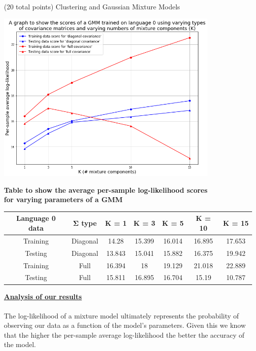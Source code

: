\documentclass[12pt]{article}
\begin{document}
\begin{question}{(20 total points) Clustering and Gaussian Mixture Models}
\begin{subquestion}
      \begin{answerbox}{52.8em}
        \scriptsize{
        \begin{center}
        \includegraphics[width=0.82\textwidth]{images/q35.png}
        \end{center}
        \begin{center}
        \textbf{Table to show the average per-sample log-likelihood scores} \\
        \textbf{for varying parameters of a GMM} \\
        \vspace{0.3cm}
        \begin{tabular}{ |c|c|c|c|c|c|c| } \hline
        \textbf{Language 0 data} & \textbf{$\mathbf{\Sigma}$ type} & \textbf{K = 1} & \textbf{K = 3} & \textbf{K = 5} & \textbf{K = 10} & \textbf{K = 15} \\ \hline
        Training & Diagonal & 14.28 & 15.399 & 16.014 & 16.895 & 17.653 \\
        Testing & Diagonal & 13.843 & 15.041 & 15.882 & 16.375 & 19.942 \\
        Training & Full & 16.394 & 18 & 19.129 & 21.018 & 22.889 \\
        Testing & Full & 15.811 & 16.895 & 16.704 & 15.19 & 10.787 \\ \hline
        \end{tabular}
        \end{center}
        \textbf{\footnotesize{\underline{Analysis of our results}}}\\
\\
        The log-likelihood of a mixture model ultimately represents the probability of observing our data as a function of the model's parameters. Given this we know that the higher the per-sample average log-likelihood the better the accuracy of the model.\\
}
\end{answerbox}
\end{subquestion}
\end{question}
\end{document}
